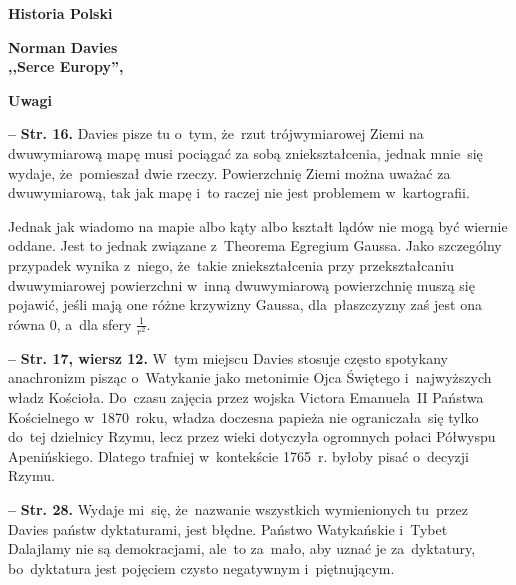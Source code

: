 \documentclass[a4paper,11pt]{article}
\newcommand{\spaceTwo}{2em}
\newcommand{\spaceThree}{1em}
\newcommand{\spaceFour}{0.5em}
\newcommand{\tb}{\textbf}
\newcommand{\noi}{\noindent}
\newcommand{\start}{\noi \tb{--} {}}
\newcommand{\Center}[1]{\begin{center} #1 \end{center}}
\newcommand{\CenterTB}[1]{\Center{\tb{#1}}}
\newcommand{\Str}[1]{\tb{Str. #1.}}
\newcommand{\StrWg}[2]{\tb{Str. #1, wiersz #2.}}
\newcommand{\Field}[1]{ \begin{center} {\LARGE \tb{#1} } \end{center} }
\newcommand{\Work}[1]{ \begin{center} {\large \tb{#1}} \end{center} }
\begin{document}
\vspace{\spaceTwo}











\newpage
\Field{Historia Polski}

\vspace{\spaceTwo} \vspace{\spaceThree}



\Work{
  Norman Davies \\
  ,,Serce Europy'', \cite{DaviesSerceEuropy14} }


\CenterTB{Uwagi}

\start \Str{16} Davies pisze tu o~tym, że~rzut trójwymiarowej Ziemi na
dwuwymiarową mapę musi pociągać za sobą zniekształcenia, jednak
mnie~się wydaje, że~pomieszał dwie rzeczy. Powierzchnię Ziemi można
uważać za dwuwymiarową, tak jak mapę i~to raczej nie jest problemem
w~kartografii.

Jednak jak wiadomo na mapie albo kąty albo kształt lądów nie mogą być
wiernie oddane. Jest to jednak związane z~Theorema Egregium Gaussa.
Jako szczególny przypadek wynika z~niego, że~takie zniekształcenia
przy przekształcaniu dwuwymiarowej powierzchni w~inną dwuwymiarową
powierzchnię muszą się pojawić, jeśli mają one różne krzywizny Gaussa,
dla~płaszczyzny zaś jest ona równa 0, a~dla sfery
$\frac{ 1 }{ r^{ 2 } }$.

\vspace{\spaceFour}


\start \StrWg{17}{12} W~tym miejscu Davies stosuje często spotykany
anachronizm pisząc o~Watykanie jako metonimie Ojca Świętego
i~najwyższych władz Kościoła. Do~czasu zajęcia przez wojska Victora
Emanuela~II Państwa Kościelnego w~1870~roku, władza doczesna papieża
nie ograniczała~się tylko do~tej dzielnicy Rzymu, lecz przez wieki
dotyczyła ogromnych połaci Półwyspu Apenińskiego. Dlatego trafniej
w~kontekście 1765~r. byłoby pisać o~decyzji Rzymu.

\vspace{\spaceFour}


\start \Str{28} Wydaje mi~się, że~nazwanie wszystkich wymienionych
tu~przez Davies państw dyktaturami, jest błędne. Państwo Watykańskie
i~Tybet Dalajlamy nie są demokracjami, ale~to za~mało, aby uznać je
za~dyktatury, bo~dyktatura jest pojęciem czysto negatywnym
i~piętnującym.
\end{document}
